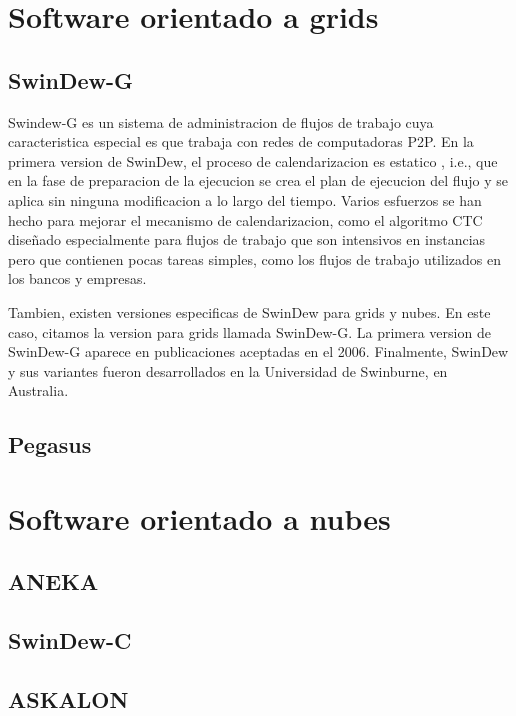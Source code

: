 \section{Software orientado a grids}

\subsection{SwinDew-G}
Swindew-G es un sistema de administracion de flujos de trabajo cuya caracteristica especial es que trabaja con redes de computadoras P2P. En la primera version de SwinDew, el proceso de calendarizacion es estatico \cite{yang2007peer}, i.e., que en la fase de preparacion de la ejecucion se crea el plan de ejecucion del flujo y se aplica sin ninguna modificacion a lo largo del tiempo. Varios esfuerzos se han hecho para mejorar el mecanismo de calendarizacion, como el algoritmo CTC \cite{liu2010compromised} diseñado especialmente para flujos de trabajo que son intensivos en instancias pero que contienen pocas tareas simples, como los flujos de trabajo utilizados en los bancos y empresas.

Tambien, existen versiones especificas de SwinDew para grids y nubes. En este caso, citamos la version para grids llamada SwinDew-G. La primera version de SwinDew-G aparece en publicaciones aceptadas en el 2006. Finalmente, SwinDew y sus variantes fueron desarrollados en la Universidad de Swinburne, en Australia.

\subsection{Pegasus}


\section{Software orientado a nubes}

\subsection{ANEKA}

\subsection{SwinDew-C}
 
\subsection{ASKALON}

